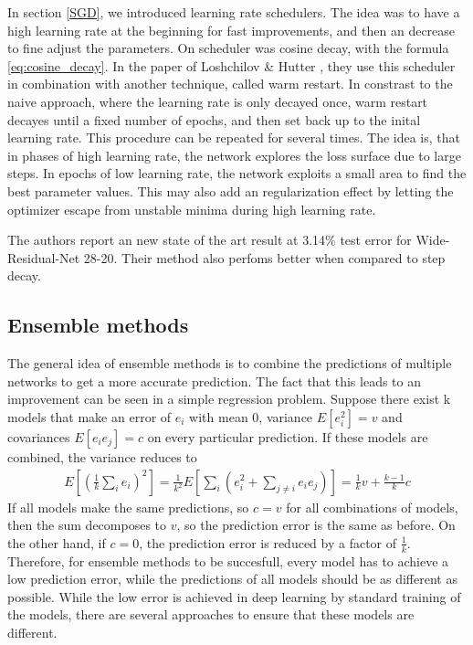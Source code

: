 In section \ref{SGD}, we introduced learning rate schedulers. The idea was to
have a high learning rate at the beginning for fast improvements, and then an
decrease to fine adjust the parameters. On scheduler was cosine decay, with the
formula \ref{eq:cosine_decay}. In the paper of Loshchilov \& Hutter
\cite{loshchilov2016sgdr}, they use this scheduler in combination with another
technique, called warm restart. In constrast to the naive approach, where the
learning rate is only decayed once, warm restart decayes until a fixed number of
epochs, and then set back up to the inital learning rate. This procedure can be
repeated for several times. The idea is, that in phases of high learning rate,
the network explores the loss surface due to large steps. In epochs of low
learning rate, the network exploits a small area to find the best parameter
values. This may also add an regularization effect by letting the optimizer
escape from unstable minima during high learning rate.

The authors report an new state of the art result at 3.14\% test error for
Wide-Residual-Net 28-20. Their method also perfoms better when compared to step
decay.
\subsection{Ensemble methods}
The general idea of ensemble methods is to combine the predictions of multiple
networks to get a more accurate prediction. The fact that this leads to an
improvement can be seen in a simple regression problem. Suppose there exist k
models that make an error of $e_i$ with mean 0, variance $E[e_i^2]=v$ and
covariances $E[e_i e_j]=c$ on every particular prediction. If these models are
combined, the variance reduces to 
\begin{align}
    E[(\frac{1}{k} \sum_i e_i)^2]=\frac{1}{k^2}E[\sum_i (e_i^2 + \sum_{j\neq i} e_i e_j)]=\frac{1}{k}v+\frac{k-1}{k}c
\end{align}
If all models make the same predictions, so $c=v$ for all combinations of
models, then the sum decomposes to $v$, so the prediction error is the same as
before. On the other hand, if $c=0$, the prediction error is reduced by a factor
of $\frac{1}{k}$. Therefore, for ensemble methods to be succesfull, every model
has to achieve a low prediction error, while the predictions of all models
should be as different as possible. While the low error is achieved in deep
learning by standard training of the models, there are several approaches to
ensure that these models are different. 

